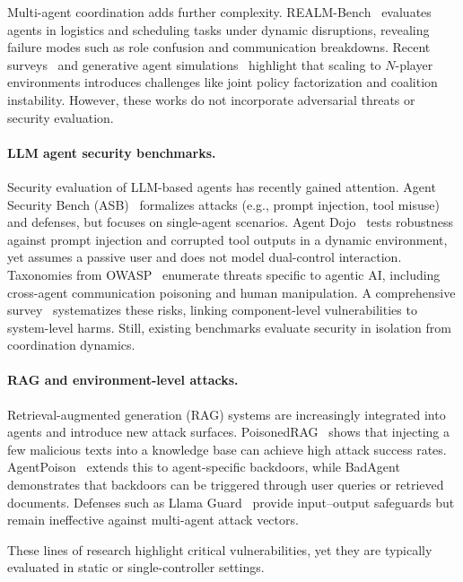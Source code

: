 \documentclass[11pt]{article}
\begin{document}
    Multi-agent coordination adds further complexity. REALM-Bench~\cite{geng2025realm} evaluates agents in logistics and scheduling tasks under dynamic disruptions, revealing failure modes such as role confusion and communication breakdowns. Recent surveys~\cite{jin2025survey} and generative agent simulations~\cite{park2023generative} highlight that scaling to $N$-player environments introduces challenges like joint policy factorization and coalition instability. However, these works do not incorporate adversarial threats or security evaluation.

    \paragraph{LLM agent security benchmarks.}
    Security evaluation of LLM-based agents has recently gained attention. Agent Security Bench (ASB)~\cite{zhang2025asb} formalizes attacks (e.g., prompt injection, tool misuse) and defenses, but focuses on single-agent scenarios. Agent Dojo~\cite{debenedetti2024agentdojo} tests robustness against prompt injection and corrupted tool outputs in a dynamic environment, yet assumes a passive user and does not model dual-control interaction.
    Taxonomies from OWASP~\cite{owasp2025agentic, owasp2025top10} enumerate threats specific to agentic AI, including cross-agent communication poisoning and human manipulation. A comprehensive survey~\cite{datta2025agentic} systematizes these risks, linking component-level vulnerabilities to system-level harms. Still, existing benchmarks evaluate security in isolation from coordination dynamics.

    \paragraph{RAG and environment-level attacks.}
    Retrieval-augmented generation (RAG) systems are increasingly integrated into agents and introduce new attack surfaces. PoisonedRAG~\cite{zou2024poisonedrag} shows that injecting a few malicious texts into a knowledge base can achieve high attack success rates. AgentPoison~\cite{chen2024agentpoison} extends this to agent-specific backdoors, while BadAgent~\cite{wang2024badagent} demonstrates that backdoors can be triggered through user queries or retrieved documents. Defenses such as Llama Guard~\cite{inan2023llamaguard} provide input–output safeguards but remain ineffective against multi-agent attack vectors.

    These lines of research highlight critical vulnerabilities, yet they are typically evaluated in static or single-controller settings.
\end{document}

